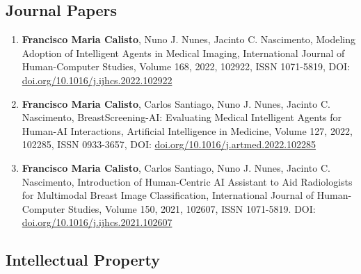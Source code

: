 \subsection{Journal Papers}
\label{sec:chap00100602}

\begin{enumerate}
\item {\bf Francisco Maria Calisto}, Nuno J. Nunes, Jacinto C. Nascimento, Modeling Adoption of Intelligent Agents in Medical Imaging, International Journal of Human-Computer Studies, Volume 168, 2022, 102922, ISSN 1071-5819, DOI: \href{https://doi.org/10.1016/j.ijhcs.2022.102922}{doi.org/10.1016/j.ijhcs.2022.102922}
\item {\bf Francisco Maria Calisto}, Carlos Santiago, Nuno J. Nunes, Jacinto C. Nascimento, BreastScreening-AI: Evaluating Medical Intelligent Agents for Human-AI Interactions, Artificial Intelligence in Medicine, Volume 127, 2022, 102285, ISSN 0933-3657, DOI: \href{https://doi.org/10.1016/j.artmed.2022.102285}{doi.org/10.1016/j.artmed.2022.102285}
\item {\bf Francisco Maria Calisto}, Carlos Santiago, Nuno J. Nunes, Jacinto C. Nascimento, Introduction of Human-Centric AI Assistant to Aid Radiologists for Multimodal Breast Image Classification, International Journal of Human-Computer Studies, Volume 150, 2021, 102607, ISSN 1071-5819. DOI: \href{https://doi.org/10.1016/j.ijhcs.2021.102607}{doi.org/10.1016/j.ijhcs.2021.102607}
\end{enumerate}

\subsection{Intellectual Property}
\label{sec:chap00100603}

